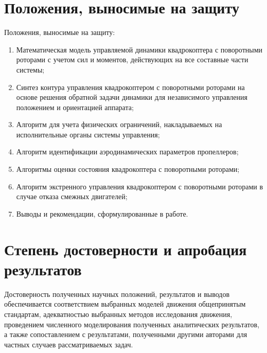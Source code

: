 \section{Положения, выносимые на защиту}
Положения, выносимые на защиту:
\begin{enumerate}
\item Математическая модель управляемой динамики квадрокоптера с поворотными роторами с учетом сил и моментов, действующих на все составные части системы;
\item Синтез контура управления квадрокоптером с поворотными роторами на основе решения обратной задачи динамики для независимого управления положением и ориентацией аппарата; 
\item Алгоритм для учета физических ограничений, накладываемых на исполнительные органы системы управления;
\item Алгоритм идентификации аэродинамических параметров пропеллеров;
\item Алгоритмы оценки состояния квадрокоптера с поворотными роторами;
\item Алгоритм экстренного управления квадрокоптером с поворотными роторами в случае отказа смежных двигателей;
\item Выводы и рекомендации, сформулированные в работе.
\end{enumerate}

\section{Степень достоверности и апробация результатов}
Достоверность полученных научных положений, результатов и выводов обеспечивается
соответствием выбранных моделей движения общепринятым стандартам,
адекватностью выбранных методов исследования движения,
проведением численного моделирования полученных аналитических результатов,
а также сопоставлением с результатами,
полученными другими авторами для частных случаев рассматриваемых задач.

